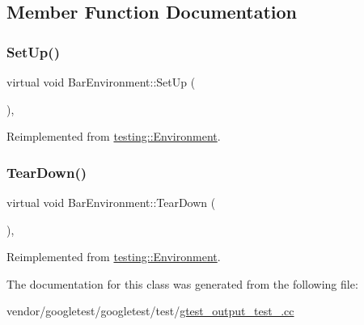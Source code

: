 \subsection{Member Function Documentation}
\mbox{\label{class_bar_environment_a88e17c5dd1dcea7a4538f2f3c6bf7bdd}} 
\subsubsection{\texorpdfstring{Set\+Up()}{SetUp()}}
{\footnotesize\ttfamily virtual void Bar\+Environment\+::\+Set\+Up (\begin{DoxyParamCaption}{ }\end{DoxyParamCaption})\hspace{0.3cm}{\ttfamily [inline]}, {\ttfamily [virtual]}}



Reimplemented from \hyperlink{classtesting_1_1_environment_a1bf8cafaa9d4eba9feb98655ee434eb3}{testing\+::\+Environment}.

\mbox{\label{class_bar_environment_a384f951da72a2a18bb0c2b3506376b09}} 
\subsubsection{\texorpdfstring{Tear\+Down()}{TearDown()}}
{\footnotesize\ttfamily virtual void Bar\+Environment\+::\+Tear\+Down (\begin{DoxyParamCaption}{ }\end{DoxyParamCaption})\hspace{0.3cm}{\ttfamily [inline]}, {\ttfamily [virtual]}}



Reimplemented from \hyperlink{classtesting_1_1_environment_a039bdaa705c46b9b88234cf4d3bb6254}{testing\+::\+Environment}.



The documentation for this class was generated from the following file\+:\begin{DoxyCompactItemize}
\item 
vendor/googletest/googletest/test/\hyperlink{gtest__output__test___8cc}{gtest\+\_\+output\+\_\+test\+\_\+.\+cc}\end{DoxyCompactItemize}
